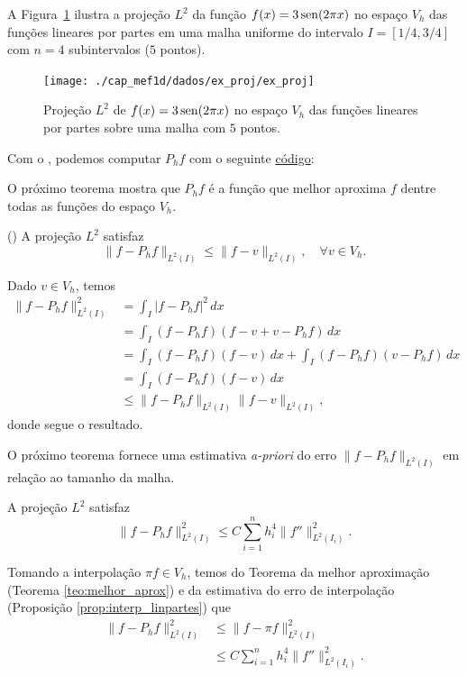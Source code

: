 \begin{ex}\label{ex:proj}
  A Figura~\ref{fig:ex_proj} ilustra a projeção $L^2$ da função $f(x)=3\operatorname{sen}(2\pi x)$ no espaço $V_h$ das funções lineares por partes em uma malha uniforme do intervalo $I=[1/4, 3/4]$ com $n=4$ subintervalos ($5$ pontos). 

  \begin{figure}[h!]
    \centering
    \texttt{[image: ./cap\_mef1d/dados/ex\_proj/ex\_proj]}
    \caption{Projeção $L^2$ de $f(x)=3\operatorname{sen}(2\pi x)$ no espaço $V_h$ das funções lineares por partes sobre uma malha com $5$ pontos.}
    \label{fig:ex_proj}
  \end{figure}

\ifispython
Com o \fenics, podemos computar $P_h f$ com o seguinte \href{https://github.com/phkonzen/notas/blob/master/src/MetodoElementosFinitos/cap_mef1d/dados/ex_proj/ex_proj.py}{código}:

\fi
\end{ex}

O próximo teorema mostra que $P_h f$ é a função que melhor aproxima $f$ dentre todas as funções do espaço $V_h$.

\begin{teo}()\label{teo:melhor_aprox}
  A projeção $L^2$ satisfaz
  \begin{equation}
    \|f-P_hf\|_{L^2(I)} \leq \|f - v\|_{L^2(I)},\quad\forall v\in V_h.
  \end{equation}
\end{teo}
\begin{dem}
  Dado $v\in V_h$, temos
  \begin{align}
    \|f-P_hf\|_{L^2(I)}^2 &= \int_I |f-P_hf|^2\,dx\\
    &= \int_I (f-P_hf)(f-v+v-P_hf)\,dx\\
    &= \int_I(f-P_hf)(f-v)\,dx + \int_I(f-P_hf)(v-P_hf)\,dx\\
    &= \int_I (f-P_hf)(f-v)\,dx\\
    &\leq \|f-P_hf\|_{L^2(I)}\|f-v\|_{L^2(I)},
  \end{align}
donde segue o resultado.
\end{dem}

O próximo teorema fornece uma estimativa {\it a-priori} do erro $\|f-P_h f\|_{L^2(I)}$ em relação ao tamanho da malha.

\begin{teo}\label{teo:erro_proj_1d}
  A projeção $L^2$ satisfaz
  \begin{equation}
    \|f-P_hf\|_{L^2(I)}^2 \leq C\sum_{i=1}^n h_i^4\|f''\|_{L^2(I_i)}^2.
  \end{equation}
\end{teo}
\begin{dem}
  Tomando a interpolação $\pi f \in V_h$, temos do Teorema da melhor aproximação (Teorema \ref{teo:melhor_aprox}) e da estimativa do erro de interpolação (Proposição \ref{prop:interp_linpartes}) que
  \begin{align}
    \|f - P_hf\|_{L^2(I)}^2 &\leq \|f-\pi f\|_{L^2(I)}^2\\
    &\leq C\sum_{i=1}^n h_i^4\|f''\|_{L^2(I_i)}^2.
  \end{align}
\end{dem}

